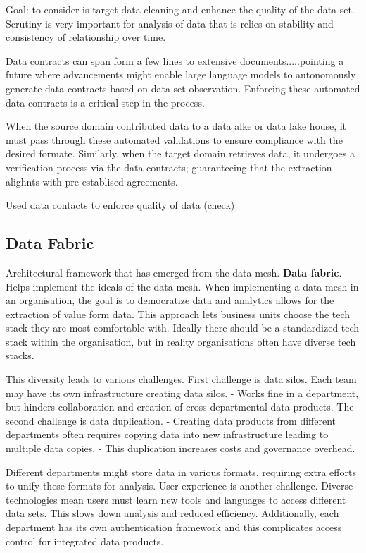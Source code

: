\documentclass[a4paper, 11pt]{article}
\begin{document}
    Goal: to consider is target data cleaning and enhance the quality of the data set.
    Scrutiny is very important for analysis of data that is relies on stability and consistency of relationship over time.

    Data contracts can span form a few lines to extensive documents.....pointing a future where advancements might enable large language models to autonomously generate data contracts based on data set observation.
    Enforcing these automated data contracts is a critical step in the process.

    When the source domain contributed data to a data alke or data lake house, it must pass through these automated validations to ensure compliance with the desired formate.
    Similarly, when the target domain retrieves data, it undergoes a verification process via the data contracts; guaranteeing that the extraction alighnts with pre-establised agreements.

    Used data contacts to enforce quality of data (check)

    \subsection{Data Fabric}
    Architectural framework that has emerged from the data mesh. \textbf{Data fabric}.
    Helps implement the ideals of the data mesh.
    When implementing a data mesh in an organisation, the goal is to democratize data and analytics allows for the extraction of value form data.
    This approach lets business units choose the tech stack they are most comfortable with.
    Ideally there should be a standardized tech stack within the organisation, but in reality organisations often have diverse tech stacks.

    This diversity leads to various challenges.
    First challenge is data silos.
    Each team may have its own infrastructure creating data silos.
    - Works fine in a department, but hinders collaboration and creation of cross departmental data products.
    The second challenge is data duplication.
    - Creating data products from different departments often requires copying data into new infrastructure leading to multiple data copies.
    - This duplication increases costs and governance overhead.

    Different departments might store data in various formats, requiring extra efforts to unify these formats for analysis.
    User experience is another challenge.
    Diverse technologies mean users must learn new tools and languages to access different data sets.
    This slows down analysis and reduced efficiency.
    Additionally, each department has its own authentication framework and this complicates access control for integrated data products.
\end{document}

